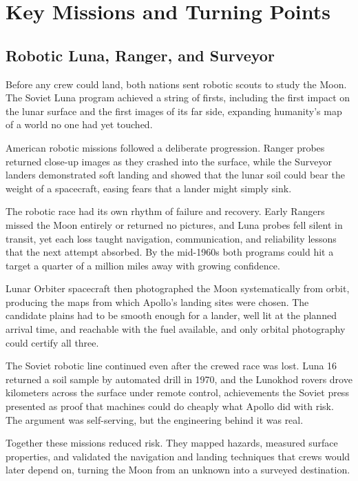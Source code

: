 \section{Key Missions and Turning Points}

\subsection{Robotic Luna, Ranger, and Surveyor}
Before any crew could land, both nations sent robotic scouts to study the Moon. The Soviet Luna program achieved a string of firsts, including the first impact on the lunar surface and the first images of its far side, expanding humanity's map of a world no one had yet touched.

American robotic missions followed a deliberate progression. Ranger probes returned close-up images as they crashed into the surface, while the Surveyor landers demonstrated soft landing and showed that the lunar soil could bear the weight of a spacecraft, easing fears that a lander might simply sink.

The robotic race had its own rhythm of failure and recovery. Early Rangers missed the Moon entirely or returned no pictures, and Luna probes fell silent in transit, yet each loss taught navigation, communication, and reliability lessons that the next attempt absorbed. By the mid-1960s both programs could hit a target a quarter of a million miles away with growing confidence.

Lunar Orbiter spacecraft then photographed the Moon systematically from orbit, producing the maps from which Apollo's landing sites were chosen. The candidate plains had to be smooth enough for a lander, well lit at the planned arrival time, and reachable with the fuel available, and only orbital photography could certify all three.

The Soviet robotic line continued even after the crewed race was lost. Luna 16 returned a soil sample by automated drill in 1970, and the Lunokhod rovers drove kilometers across the surface under remote control, achievements the Soviet press presented as proof that machines could do cheaply what Apollo did with risk. The argument was self-serving, but the engineering behind it was real.

Together these missions reduced risk. They mapped hazards, measured surface properties, and validated the navigation and landing techniques that crews would later depend on, turning the Moon from an unknown into a surveyed destination. \cite{siddiqi2010} \cite{nasa2019}

